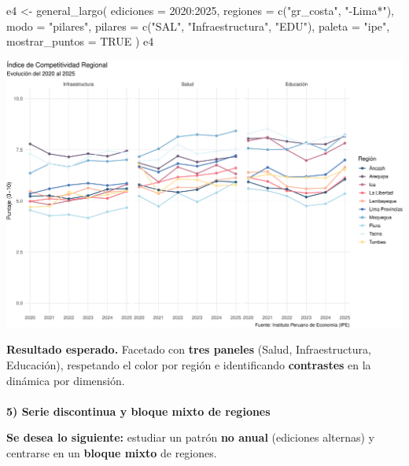 \documentclass[
  11pt,
  letterpaper,
  DIV=11,
  numbers=noendperiod]{scrartcl}
\makeatletter
\let\oldparagraph\paragraph
\renewcommand{\paragraph}{
    \@ifstar
      \xxxParagraphStar
      \xxxParagraphNoStar
  }
\newcommand{\xxxParagraphStar}[1]{\oldparagraph*{#1}\mbox{}}
\newcommand{\xxxParagraphNoStar}[1]{\oldparagraph{#1}\mbox{}}
\newenvironment{Shaded}{\begin{snugshade}}{\end{snugshade}}
\newcommand{\AttributeTok}[1]{\textcolor[rgb]{0.40,0.45,0.13}{#1}}
\newcommand{\ConstantTok}[1]{\textcolor[rgb]{0.56,0.35,0.01}{#1}}
\newcommand{\DecValTok}[1]{\textcolor[rgb]{0.68,0.00,0.00}{#1}}
\newcommand{\FunctionTok}[1]{\textcolor[rgb]{0.28,0.35,0.67}{#1}}
\newcommand{\NormalTok}[1]{\textcolor[rgb]{0.00,0.23,0.31}{#1}}
\newcommand{\OtherTok}[1]{\textcolor[rgb]{0.00,0.23,0.31}{#1}}
\newcommand{\SpecialCharTok}[1]{\textcolor[rgb]{0.37,0.37,0.37}{#1}}
\newcommand{\StringTok}[1]{\textcolor[rgb]{0.13,0.47,0.30}{#1}}
\makeatother
\begin{document}
\begin{Shaded}
\begin{Highlighting}[]
\NormalTok{e4 }\OtherTok{\textless{}{-}} \FunctionTok{general\_largo}\NormalTok{(}
  \AttributeTok{ediciones =} \DecValTok{2020}\SpecialCharTok{:}\DecValTok{2025}\NormalTok{,}
  \AttributeTok{regiones  =} \FunctionTok{c}\NormalTok{(}\StringTok{"gr\_costa"}\NormalTok{, }\StringTok{"{-}Lima*"}\NormalTok{),}
  \AttributeTok{modo      =} \StringTok{"pilares"}\NormalTok{,}
  \AttributeTok{pilares   =} \FunctionTok{c}\NormalTok{(}\StringTok{"SAL"}\NormalTok{, }\StringTok{"Infraestructura"}\NormalTok{, }\StringTok{"EDU"}\NormalTok{),}
  \AttributeTok{paleta    =} \StringTok{"ipe"}\NormalTok{,}
  \AttributeTok{mostrar\_puntos =} \ConstantTok{TRUE}
\NormalTok{)}
\NormalTok{e4}
\end{Highlighting}
\end{Shaded}

\includegraphics{Manual_files/figure-pdf/unnamed-chunk-39-1.pdf}

\textbf{Resultado esperado.} Facetado con \textbf{tres paneles} (Salud,
Infraestructura, Educación), respetando el color por región e
identificando \textbf{contrastes} en la dinámica por dimensión.

\paragraph{\texorpdfstring{\textbf{5) Serie discontinua y bloque mixto
de
regiones}}{5) Serie discontinua y bloque mixto de regiones}}\label{serie-discontinua-y-bloque-mixto-de-regiones}

\textbf{Se desea lo siguiente:} estudiar un patrón \textbf{no anual}
(ediciones alternas) y centrarse en un \textbf{bloque mixto} de
regiones.
\end{document}
